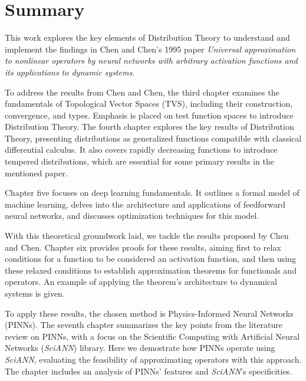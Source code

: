 %

\chapter{Summary}

This work explores the key elements of Distribution Theory to understand and implement the findings in Chen and Chen's 1995 paper \textit{Universal approximation to nonlinear operators by neural networks with
arbitrary activation functions and its applications to dynamic systems}.

To address the results from Chen and Chen, the third chapter examines the fundamentals of Topological Vector Spaces (TVS), including their construction, convergence, and types. Emphasis is placed on test function spaces to introduce Distribution Theory. The fourth chapter explores the key results of Distribution Theory, presenting distributions as generalized functions compatible with classical differential calculus. It also covers rapidly decreasing functions to introduce tempered distributions, which are essential for some primary results in the mentioned paper.

Chapter five focuses on deep learning fundamentals. It outlines a formal model of machine learning, delves into the architecture and applications of feedforward neural networks, and discusses optimization techniques for this model.

With this theoretical groundwork laid, we tackle the results proposed by Chen and Chen. Chapter six provides proofs for these results, aiming first to relax conditions for a function to be considered an activation function, and then using these relaxed conditions to establish approximation theorems for functionals and operators. An example of applying the theorem's architecture to dynamical systems is given.

To apply these results, the chosen method is Physics-Informed Neural Networks (PINNs). The seventh chapter summarizes the key points from the literature review on PINNs, with a focus on the Scientific Computing with Artificial Neural Networks (\textit{SciANN}) library. Here we demostrate how PINNs operate using \textit{SciANN}, evaluating the feasibility of approximating operators with this approach. The chapter includes an analysis of PINNs' features and \textit{SciANN}'s specificities.


